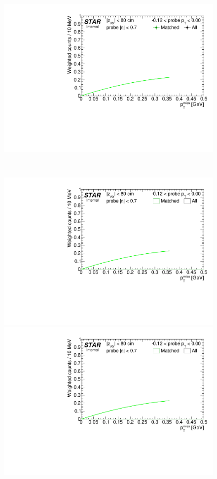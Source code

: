 \begin{figure}[h!]
{  \includegraphics[width=\linewidth,page=6]{graphics/correctionsToEff/TOF_tagAndProbe/Fitting_effVsPt_data.CPT.pdf}

}~
\parbox{0.495\textwidth}{
  \centering
\vspace{175pt}
  \includegraphics[width=\linewidth,page=5]{graphics/correctionsToEff/TOF_tagAndProbe/Fitting_effVsPt_mc.CPT.pdf}\\
  \includegraphics[width=\linewidth,page=6]{graphics/correctionsToEff/TOF_tagAndProbe/Fitting_effVsPt_mc.CPT.pdf}

}
\end{figure}
